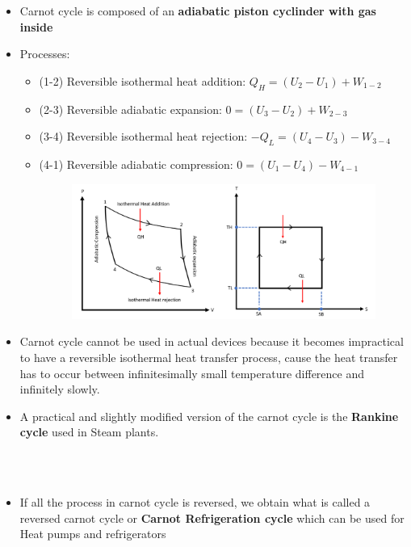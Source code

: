 \documentclass[8pt]{article}
\begin{document}
		\begin{itemize}
			\item Carnot cycle is composed of an \textbf{adiabatic piston cyclinder with gas inside} 
			\item Processes:
				\begin{itemize}
					\item (1-2) Reversible isothermal heat addition: $\boxed{Q_H = (U_2-U_1)+W_{1-2}}$
					\item (2-3) Reversible adiabatic expansion: $\boxed{0 = (U_3-U_2)+W_{2-3}}$
					\item (3-4) Reversible isothermal heat rejection: $\boxed{-Q_L=(U_4-U_3)-W_{3-4}}$
					\item (4-1) Reversible adiabatic compression: $\boxed{0=(U_1-U_4)-W_{4-1}}$				
					\begin{figure}[H]
						\includegraphics[scale=0.3]{carnot_combined.png}
						\centering
					\end{figure}
				\end{itemize}
			\item Carnot cycle cannot be used in actual devices because it becomes impractical to have a reversible isothermal heat transfer process, cause the heat transfer has to occur between infinitesimally small temperature difference and infinitely slowly. 
			\item A practical and slightly modified version of the carnot cycle is the \textbf{Rankine cycle} used in Steam plants. 
		\end{itemize}
		\hrulefill\\
\\
		\begin{itemize}
			\item If all the process in carnot cycle is reversed, we obtain what is called a reversed carnot cycle or \textbf{Carnot Refrigeration cycle} which can be used for Heat pumps and refrigerators
		\end{itemize}
\end{document}
